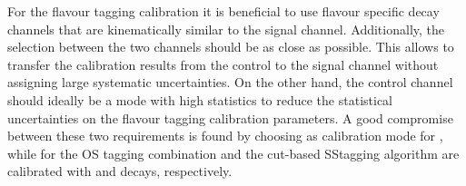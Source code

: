 For the flavour tagging calibration it is beneficial to use flavour specific
decay channels that are kinematically similar to the signal channel.
Additionally, the selection between the two channels should be as close as
possible. This allows to transfer the calibration results from the control to
the signal channel without assigning large systematic uncertainties. On the
other hand, the control channel should ideally be a mode with high statistics
to reduce the statistical uncertainties on the flavour tagging calibration
parameters. A good compromise between these two requirements is found by
choosing \BdToDsD as calibration mode for \BdToDD, while for \BdToJPsiKS the
OS tagging combination and the cut-based SS\pion tagging algorithm are
calibrated with \BuToJPsiK and \BdToJPsiKstar decays, respectively.



